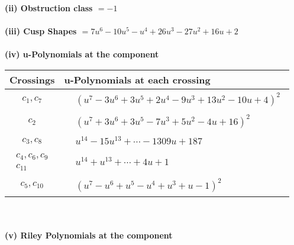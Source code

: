 \documentclass[1p]{elsarticle_modified}
\theoremstyle{definition}
\begin{document}
\flushleft \textbf{(ii) Obstruction class $= -1$}\\~\\
\flushleft \textbf{(iii) Cusp Shapes $= 7 u^6-10 u^5- u^4+26 u^3-27 u^2+16 u+2$}\\~\\
\newpage\renewcommand{\arraystretch}{1}
\flushleft \textbf{(iv) u-Polynomials at the component}\newline \\
\begin{tabular}{m{50pt}|m{274pt}}
Crossings & \hspace{64pt}u-Polynomials at each crossing \\
\hline $$\begin{aligned}c_{1},c_{7}\end{aligned}$$&$\begin{aligned}
&(u^7-3 u^6+3 u^5+2 u^4-9 u^3+13 u^2-10 u+4)^2
\end{aligned}$\\
\hline $$\begin{aligned}c_{2}\end{aligned}$$&$\begin{aligned}
&(u^7+3 u^6+3 u^5-7 u^3+5 u^2-4 u+16)^2
\end{aligned}$\\
\hline $$\begin{aligned}c_{3},c_{8}\end{aligned}$$&$\begin{aligned}
&u^{14}-15 u^{13}+\cdots-1309 u+187
\end{aligned}$\\
\hline $$\begin{aligned}c_{4},c_{6},c_{9}\\c_{11}\end{aligned}$$&$\begin{aligned}
&u^{14}+u^{13}+\cdots+4 u+1
\end{aligned}$\\
\hline $$\begin{aligned}c_{5},c_{10}\end{aligned}$$&$\begin{aligned}
&(u^7- u^6+u^5- u^4+u^3+u-1)^2
\end{aligned}$\\
\hline
\end{tabular}\\~\\
\newpage\renewcommand{\arraystretch}{1}
\flushleft \textbf{(v) Riley Polynomials at the component}\newline \\
\end{document}
